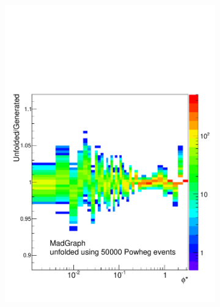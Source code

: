 \begin{figure}[!htbp]
\begin{subfigure}[b]{\SideBySidePlotWidth}
        \includegraphics[width=\textwidth]{figures/ToyMC_PM_50000.pdf}
        \caption{}
        \label{fig:toy_mc_50000}
    \end{subfigure}%
    \begin{subfigure}[b]{\SideBySidePlotWidth}

\end{subfigure}
\end{figure}
